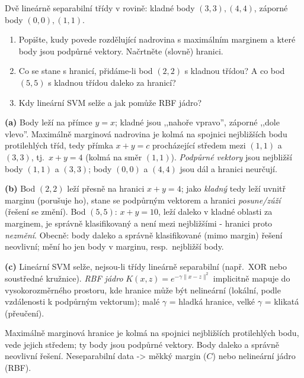 \begin{zadani}
Dvě lineárně separabilní třídy v rovině: kladné body $(3,3),(4,4)$, záporné body $(0,0),(1,1)$.
\begin{enumerate}[label=(\alph*)]
  \item {} Popište, kudy povede rozdělující nadrovina s maximálním marginem a které body jsou podpůrné vektory. Načrtněte (slovně) hranici.
  \item {} Co se stane s hranicí, přidáme-li bod $(2,2)$ s kladnou třídou? A co bod $(5,5)$ s kladnou třídou daleko za hranicí?
  \item {} Kdy lineární SVM selže a jak pomůže RBF jádro?
\end{enumerate}
\end{zadani}

\begin{reseni}
\textbf{(a)} Body leží na přímce $y=x$; kladné jsou ,,nahoře vpravo'', záporné ,,dole vlevo''. Maximálně marginová nadrovina je kolmá na spojnici nejbližších bodu protilehlých tříd, tedy přímka $x+y=c$ procházející středem mezi $(1,1)$ a $(3,3)$, tj.\ $x+y=4$ (kolmá na směr $(1,1)$). \emph{Podpůrné vektory} jsou nejbližší body $(1,1)$ a $(3,3)$; body $(0,0)$ a $(4,4)$ jsou dál a hranici neurčují.

\textbf{(b)} Bod $(2,2)$ leží přesně na hranici $x+y=4$; jako \emph{kladný} tedy leží uvnitř marginu (porušuje ho), stane se podpůrným vektorem a hranici \emph{posune/zúží} (řešení se změní). Bod $(5,5)$: $x+y=10$, leží daleko v kladné oblasti za marginem, je správně klasifikovaný a není mezi nejbližšími - hranici proto \emph{nezmění}. Obecně: body daleko a správně klasifikované (mimo margin) řešení neovlivní; mění ho jen body v marginu, resp.\ nejbližší body.

\textbf{(c)} Lineární SVM selže, nejsou-li třídy lineárně separabilní (např.\ XOR nebo soustředné kružnice). \emph{RBF jádro} $K(x,z)=e^{-\gamma\lVert x-z\rVert^2}$ implicitně mapuje do vysokorozměrného prostoru, kde hranice může být nelineární (lokální, podle vzdálenosti k podpůrným vektorum); malé $\gamma$ = hladká hranice, velké $\gamma$ = klikatá (přeučení).
\end{reseni}

\begin{jadro}
Maximálně marginová hranice je kolmá na spojnici nejbližších protilehlých bodu, vede jejich středem; ty body jsou podpůrné vektory. Body daleko a správně neovlivní řešení. Neseparabilní data -> měkký margin ($C$) nebo nelineární jádro (RBF).
\end{jadro}

